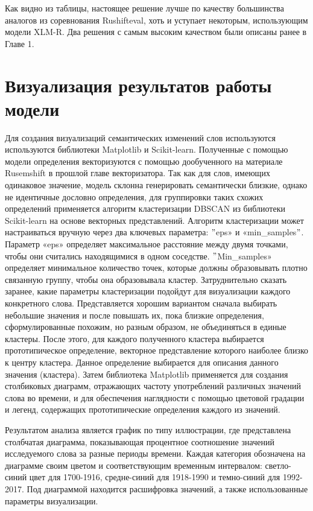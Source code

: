 \documentclass[LI,VKR]{HSEUniversity}
\begin{document}
Как видно из таблицы, настоящее решение лучше по качеству
большинства аналогов из соревнования Rushifteval,
хоть и уступает некоторым, использующим модели XLM-R.
Два решения с самым высоким качеством были описаны ранее в Главе 1.

\section{Визуализация результатов работы модели}

Для создания визуализаций семантических изменений слов используются используются библиотеки
Matplotlib и Scikit-learn.
Полученные с помощью модели определения векторизуются с помощью дообученного
на материале Rusemshift в прошлой главе векторизатора.
Так как для слов, имеющих одинаковое значение,
модель склонна генерировать семантически близкие, однако не идентичные дословно определения,
для группировки таких схожих определений применяется алгоритм кластеризации DBSCAN из
библиотеки Scikit-learn на основе векторных представлений.
Алгоритм кластеризации может настраиваться вручную через два ключевых параметра:
\("\)eps» и «min\_samples\("\).
Параметр «eps» определяет максимальное расстояние между двумя точками,
чтобы они считались находящимися в одном соседстве.
\("\)Min\_samples» определяет минимальное количество точек,
которые должны образовывать плотно связанную группу, чтобы она образовывала кластер.
Затруднительно сказать заранее, какие параметры кластеризации подойдут для визуализации
каждого конкретного слова.
Представляется хорошим вариантом сначала выбирать небольшие значения и после повышать их,
пока близкие определения, сформулированные похожим, но разным образом,
не объединяться в единые кластеры.
После этого, для каждого полученного кластера выбирается прототипическое определение,
векторное представление которого наиболее близко к центру кластера.
Данное определение выбирается для описания данного значения (кластера).
Затем библиотека Matplotlib применяется для создания столбиковых диаграмм,
отражающих частоту употреблений различных значений слова во времени,
и для обеспечения наглядности с помощью цветовой градации и легенд,
содержащих прототипические определения каждого из значений.

Результатом анализа является график по типу иллюстрации, где представлена столбчатая диаграмма,
показывающая процентное соотношение значений исследуемого слова за разные периоды времени.
Каждая категория обозначена на диаграмме своим цветом и соответствующим временным интервалом:
светло-синий цвет для 1700-1916, средне-синий для 1918-1990 и темно-синий для 1992-2017.
Под диаграммой находится расшифровка значений, а также использованные параметры визуализации.
\end{document}
